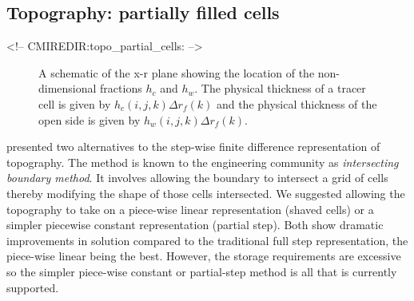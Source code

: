 \subsection{Topography: partially filled cells}
\begin{rawhtml}
<!-- CMIREDIR:topo_partial_cells: -->
\end{rawhtml}

\begin{figure}
\begin{center}
\end{center}
\caption{
A schematic of the x-r plane showing the location of the
non-dimensional fractions $h_c$ and $h_w$. The physical thickness of a
tracer cell is given by $h_c(i,j,k) \Delta r_f(k)$ and the physical
thickness of the open side is given by $h_w(i,j,k) \Delta r_f(k)$.}
\label{fig:hfacs}
\end{figure}

\cite{adcroft:97} presented two alternatives to the step-wise finite
difference representation of topography. The method is known to the
engineering community as {\em intersecting boundary method}. It
involves allowing the boundary to intersect a grid of cells thereby
modifying the shape of those cells intersected. We suggested allowing
the topography to take on a piece-wise linear representation (shaved
cells) or a simpler piecewise constant representation (partial step).
Both show dramatic improvements in solution compared to the
traditional full step representation, the piece-wise linear being the
best. However, the storage requirements are excessive so the simpler
piece-wise constant or partial-step method is all that is currently
supported.

